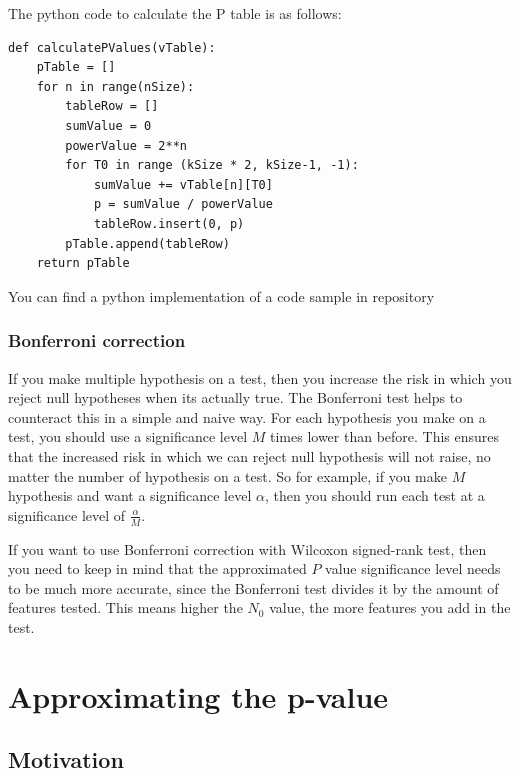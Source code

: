 \documentclass[12pt]{article}
\begin{document}
{The python code to calculate the P table is as follows:

\begin{verbatim}
def calculatePValues(vTable):
    pTable = []
    for n in range(nSize):
        tableRow = []
        sumValue = 0
        powerValue = 2**n
        for T0 in range (kSize * 2, kSize-1, -1):
            sumValue += vTable[n][T0]
            p = sumValue / powerValue
            tableRow.insert(0, p)
        pTable.append(tableRow)
    return pTable

\end{verbatim}

You can find a python implementation of a code sample in repository ~\cite{stenver_repo_p_accurate_table_py}

\subsubsection{Bonferroni correction}

If you make multiple hypothesis on a test, then you increase the risk in which you reject null hypotheses when its actually true. The Bonferroni test helps to counteract this in a simple and naive way. For each hypothesis you make on a test, you should use a significance level $M$ times lower than before. This ensures that the increased risk in which we can reject null hypothesis will not raise, no matter the number of hypothesis on a test. So for example, if you make $M$ hypothesis and want a significance level $\alpha$,  then you should run each test at a significance level of $\frac{\alpha}{M}$.

If you want to use Bonferroni correction with Wilcoxon signed-rank test, then you need to keep in mind that the approximated $P$ value significance level needs to be much more accurate, since the Bonferroni test divides it by the amount of features tested. This means higher the $N_0$ value, the more features you add in the test.

\newpage

\section{Approximating the p-value}
\label{sec:approximating_p_value}

\subsection{Motivation}

}
\end{document}
